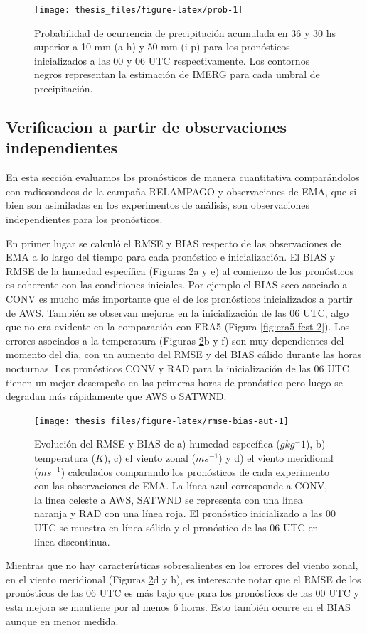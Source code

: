 \documentclass[12pt,oneside,a4paper]{reedthesis}
\begin{document}
\begin{figure}

\texttt{[image: thesis\_files/figure-latex/prob-1]} \hfill{}

\caption{Probabilidad de ocurrencia de precipitación acumulada en 36 y 30 hs superior a 10 mm (a-h) y 50 mm (i-p) para los pronósticos inicializados a las 00 y 06 UTC respectivamente. Los contornos negros representan la estimación de IMERG para cada umbral de precipitación.}\label{fig:prob}
\end{figure}
\hypertarget{verificacion-a-partir-de-observaciones-independientes}{%
\subsection{Verificacion a partir de observaciones independientes}\label{verificacion-a-partir-de-observaciones-independientes}}

En esta sección evaluamos los pronósticos de manera cuantitativa comparándolos con radiosondeos de la campaña RELAMPAGO y observaciones de EMA, que si bien son asimiladas en los experimentos de análisis, son observaciones independientes para los pronósticos.

En primer lugar se calculó el RMSE y BIAS respecto de las observaciones de EMA a lo largo del tiempo para cada pronóstico e inicialización. El BIAS y RMSE de la humedad específica (Figuras \ref{fig:rmse-bias-aut}a y e) al comienzo de los pronósticos es coherente con las condiciones iniciales. Por ejemplo el BIAS seco asociado a CONV es mucho más importante que el de los pronósticos inicializados a partir de AWS. También se observan mejoras en la inicialización de las 06 UTC, algo que no era evidente en la comparación con ERA5 (Figura \ref{fig:era5-fcst-2}). Los errores asociados a la temperatura (Figuras \ref{fig:rmse-bias-aut}b y f) son muy dependientes del momento del día, con un aumento del RMSE y del BIAS cálido durante las horas nocturnas. Los pronósticos CONV y RAD para la inicialización de las 06 UTC tienen un mejor desempeño en las primeras horas de pronóstico pero luego se degradan más rápidamente que AWS o SATWND.


\begin{figure}
\texttt{[image: thesis\_files/figure-latex/rmse-bias-aut-1]} \caption{Evolución del RMSE y BIAS de a) humedad específica (\(gkg{^-1}\)), b) temperatura (\(K\)), c) el viento zonal (\(ms^{-1}\)) y d) el viento meridional (\(ms^{-1}\)) calculados comparando los pronósticos de cada experimento con las observaciones de EMA. La línea azul corresponde a CONV, la línea celeste a AWS, SATWND se representa con una línea naranja y RAD con una línea roja. El pronóstico inicializado a las 00 UTC se muestra en línea sólida y el pronóstico de las 06 UTC en línea discontinua.}\label{fig:rmse-bias-aut}
\end{figure}
Mientras que no hay características sobresalientes en los errores del viento zonal, en el viento meridional (Figuras \ref{fig:rmse-bias-aut}d y h), es interesante notar que el RMSE de los pronósticos de las 06 UTC es más bajo que para los pronósticos de las 00 UTC y esta mejora se mantiene por al menos 6 horas. Esto también ocurre en el BIAS aunque en menor medida.
\end{document}
